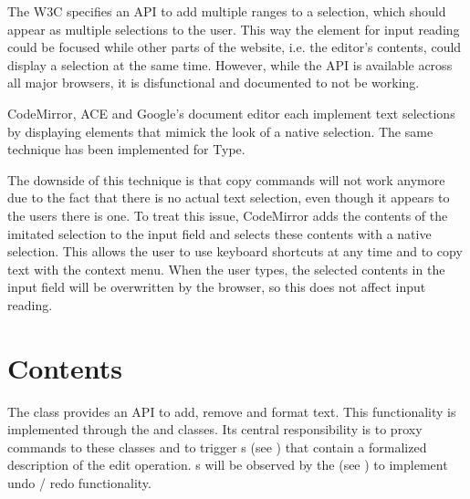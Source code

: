 The W3C specifies an API to add multiple ranges to a selection, which should appear as multiple selections to the user. This way the element for input reading could be focused while other parts of the website, i.e. the editor's contents, could display a selection at the same time. However, while the API is available across all major browsers, it is disfunctional and documented to not be working.

CodeMirror, ACE and Google's document editor each implement text selections by displaying  elements that mimick the look of a native selection. The same technique has been implemented for Type. 

The downside of this technique is that copy commands will not work anymore due to the fact that there is no actual text selection, even though it appears to the users there is one. To treat this issue, CodeMirror adds the contents of the imitated selection to the input field and selects these contents with a native selection. This allows the user to use keyboard shortcuts at any time and to copy text with the context menu. When the user types, the selected contents in the input field will be overwritten by the browser, so this does not affect input reading.





\section{Contents}
\label{sec:contents_impl}

The  class provides an API to add, remove and format text. This functionality is implemented through the  and  classes. Its central responsibility is to proxy commands to these classes and to trigger s (see ) that contain a formalized description of the edit operation. s will be observed by the  (see ) to implement undo / redo functionality.

